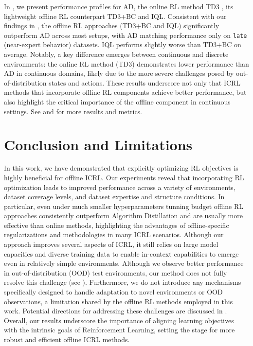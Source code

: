 \documentclass{article}
\begin{document}
In , we present performance profiles for AD, the online RL method TD3 \citep{fujimoto2018addressing}, its lightweight offline RL counterpart TD3+BC \citep{fujimoto2021minimalist} and IQL. Consistent with our findings in , the offline RL approaches (TD3+BC and IQL) significantly outperform AD across most setups, with AD matching performance only on \texttt{late} (near-expert behavior) datasets. IQL performs slightly worse than TD3+BC on average. Notably, a key difference emerges between continuous and discrete environments: the online RL method (TD3) demonstrates lower performance than AD in continuous domains, likely due to the more severe challenges posed by out-of-distribution states and actions. These results underscore not only that ICRL methods that incorporate offline RL components achieve better performance, but also highlight the critical importance of the offline component in continuous settings. See  and  for more results and metrics.
\section{Conclusion and Limitations}
In this work, we have demonstrated that explicitly optimizing RL objectives is highly beneficial for offline ICRL. Our experiments reveal that incorporating RL optimization leads to improved performance across a variety of environments, dataset coverage levels, and dataset expertise and structure conditions. In particular, even under much smaller hyperparameters tunning budget offline RL approaches consistently outperform Algorithm Distillation and are usually more effective than online methods, highlighting the advantages of offline-specific regularizations and methodologies in many ICRL scenarios.
Although our approach improves several aspects of ICRL, it still relies on large model capacities and diverse training data to enable in-context capabilities to emerge even in relatively simple environments. Although we observe better performance in out-of-distribution (OOD) test environments, our method does not fully resolve this challenge (see ). Furthermore, we do not introduce any mechanisms specifically designed to handle adaptation to novel environments or OOD observations, a limitation shared by the offline RL methods employed in this work. Potential directions for addressing these challenges are discussed in .
Overall, our results underscore the importance of aligning learning objectives with the intrinsic goals of Reinforcement Learning, setting the stage for more robust and efficient offline ICRL methods.
\FloatBarrier


\newpage
\appendix
\end{document}

